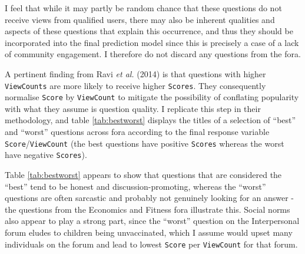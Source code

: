 \documentclass[12pt,preprint, authoryear]{article}
\numberwithin{equation}{section}
\numberwithin{figure}{section}
\numberwithin{table}{section}
\begin{document}
I feel that while it may partly be random chance that these questions do
not receive views from qualified users, there may also be inherent
qualities and aspects of these questions that explain this occurrence,
and thus they should be incorporated into the final prediction model
since this is precisely a case of a lack of community engagement. I
therefore do not discard any questions from the fora.

A pertinent finding from Ravi \emph{et al.} (2014) is that questions
with higher \texttt{ViewCounts} are more likely to receive higher
\texttt{Scores}. They consequently normalise \texttt{Score} by
\texttt{ViewCount} to mitigate the possibility of conflating popularity
with what they assume is question quality. I replicate this step in
their methodology, and table \ref{tab:bestworst} displays the titles of
a selection of ``best'' and ``worst'' questions across fora according to
the final response variable \texttt{Score}/\texttt{ViewCount} (the best
questions have positive \texttt{Scores} whereas the worst have negative
\texttt{Scores}).

Table \ref{tab:bestworst} appears to show that questions that are
considered the ``best'' tend to be honest and discussion-promoting,
whereas the ``worst'' questions are often sarcastic and probably not
genuinely looking for an answer - the questions from the Economics and
Fitness fora illustrate this. Social norms also appear to play a strong
part, since the ``worst'' question on the Interpersonal forum eludes to
children being unvaccinated, which I assume would upset many individuals
on the forum and lead to lowest \texttt{Score} per \texttt{ViewCount}
for that forum.

\newpage

\setcounter{table}{1} \footnotesize
\end{document}
